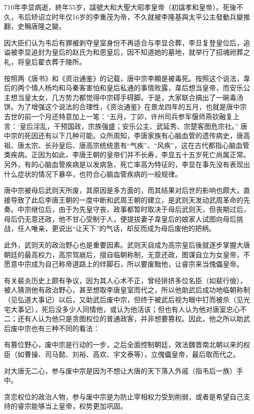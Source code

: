 710年李显病逝，終年55岁，諡號大和大聖大昭孝皇帝（初諡孝和皇帝）。死後不久，韦后矫诏立时年仅16岁的李重茂为帝，不久就被李隆基與太平公主發動兵變推翻，史稱唐隆之變。

因大臣们认为韦后有罪被剥夺皇室身份不再适合与李显合葬，李旦复登皇位后，追谥被李显追封为皇后的赵氏为和思皇后，因不知道她的墓地，就举行了招魂祔葬之礼，将皇后翟衣葬于陵所。

按照两《唐书》和《资治通鉴》的记载，唐中宗李顯是被毒死。按照这个说法，韋后的两个情人杨均和马秦客害怕和皇后私通的事情败露，韋后想当皇帝，而安乐公主想当皇太女，几方势力都觉得中宗碍手碍脚。于是，大家联合搞出了一碗毒汤饼。为了增强这个说法的合理性，《资治通鉴》在景龙四年的五月，也就是唐中宗去世的前一个月还特意加上一笔：“五月，丁卯，许州司兵参军偃师燕钦融复上言：‘皇后淫乱，干预国政，宗族强盛；安乐公主、武延秀、宗楚客图危宗社。” 唐中宗的死因还有以下几种可能。众所周知，李唐家族有心脑血管的遗传病史，唐高祖、唐太宗、长孙皇后、唐高宗统统患有“气疾”、“风疾”，这在古代都指心脑血管类疾病。正因为如此，李唐王朝的皇帝们并不长寿，李显五十五岁死亡尚属正常。另外，有的心脑血管疾病是以发病急、死亡率高为特征的，李显在事先没有表现出什么症状的情况下暴卒，也符合心脑血管疾病的一般规律。

唐中宗被母后武则天所废，其原因是多方面的，而其结果对后世的影响也颇大，直接导致了此后李唐王朝的一度中断和武周王朝的建立，是武则天发动武周革命的先奏。中宗继位后，由于为先皇守丧，政事都暂时取决于母后武则天，但丧期过后，母后仍无意还政，他不甘心受制于人，便提拔妻子韋皇后的娘家人试图向母后挑战，任人唯亲，更说出“让天下”的气话，却反而成为母后废他的把柄。

此外，武则天的政治野心也是重要因素。武则天自成为高宗皇后後就逐步掌握大唐朝廷的最高权力，高宗驾崩后，擅自临朝称制，无意还政，图谋自立为女皇帝，不愿意中宗成为自己称帝道路上的绊脚石，所以要废黜他，让睿宗来当傀儡皇帝。

有关裴炎历史上颇有争议，因为其人心术不正，曾经排挤多位名臣（如裴行儉），被人猜测他有政治野心，甚至想取李唐皇室而代之，所以他助武后成功地临朝称制（见弘道大事记）以后，又助武后废中宗，但终于被武后视为眼中钉而被杀（见光宅大事记），死后没多少人同情他，或认为他活该；但也有人认为他对唐室忠心不二；还有人认为他只是贪图权位的普通政客，并非想要篡权。因此，他之所以助武后废中宗也有三种不同的看法：

有篡位野心，废中宗是行动的一步，之后全面控制朝廷，效法魏晋南北朝以来的权臣（如曹操、司马懿、刘裕、高欢、宇文泰等），立傀儡皇帝，最后取而代之。

对大唐无二心，参与废中宗是因为不想让大唐的天下落入外戚（指韦后一族）手中。

贪恋权位的政治人物，参与废中宗是为防止宰相权力受到削弱，或者是希望自己支持的睿宗能够当上皇帝，权势更加巩固。

